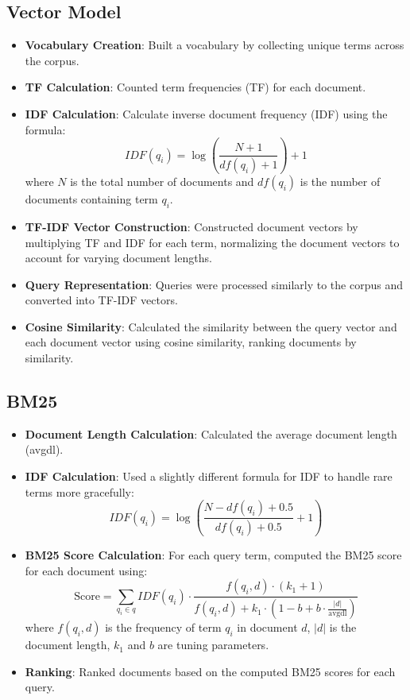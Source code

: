 \documentclass[12pt,letterpaper]{article}
\begin{document}
\subsection{Vector Model}
\begin{itemize}
    \item \textbf{Vocabulary Creation}: Built a vocabulary by collecting unique terms across the corpus.
    \item \textbf{TF Calculation}: Counted term frequencies (TF) for each document.
    \item \textbf{IDF Calculation}: Calculate inverse document frequency (IDF) using the formula:
    \begin{equation}
        IDF(q_i) = \log\left(\frac{N + 1}{df(q_i) + 1}\right) + 1
        \label{eq:idf_vsm}
    \end{equation}
    where \(N\) is the total number of documents and \(df(q_i)\) is the number of documents containing term \(q_i\).
    \item \textbf{TF-IDF Vector Construction}: Constructed document vectors by multiplying TF and IDF for each term, normalizing the document vectors to account for varying document lengths.
    \item \textbf{Query Representation}: Queries were processed similarly to the corpus and converted into TF-IDF vectors.
    \item \textbf{Cosine Similarity}: Calculated the similarity between the query vector and each document vector using cosine similarity, ranking documents by similarity.
\end{itemize}
\subsection{BM25}
\begin{itemize}
    \item \textbf{Document Length Calculation}: Calculated the average document length (avgdl).
    \item \textbf{IDF Calculation}: Used a slightly different formula for IDF to handle rare terms more gracefully:
    \begin{equation}
        IDF(q_i) = \log\left(\frac{N - df(q_i) + 0.5}{df(q_i) + 0.5} + 1\right)
        \label{eq:idf_bm25}
    \end{equation}
    \item \textbf{BM25 Score Calculation}: For each query term, computed the BM25 score for each document using:
    \begin{equation}
        \text{Score} = \sum_{q_i \in q} IDF(q_i) \cdot \frac{f(q_i, d) \cdot (k_1 + 1)}{f(q_i, d) + k_1 \cdot \left(1 - b + b \cdot \frac{|d|}{\text{avgdl}}\right)}
        \label{eq:bm25_score}
    \end{equation}
    where \( f(q_i, d) \) is the frequency of term \(q_i\) in document \(d\), \( |d| \) is the document length, \( k_1 \) and \( b \) are tuning parameters.
    \item \textbf{Ranking}: Ranked documents based on the computed BM25 scores for each query.
\end{itemize}
\end{document}
